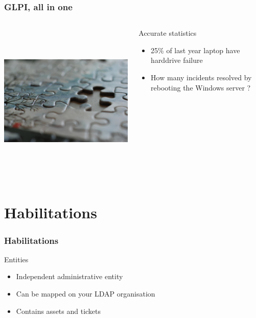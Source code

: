 \documentclass{beamer}
\begin{document}
\begin{frame}


    \frametitle{GLPI, all in one}
 \begin{columns}
 \begin{column}{0.45\textwidth}
         \includegraphics[height=7.5cm]{./pics/glpithelink.jpg}
 \end{column}
 \begin{column}{0.65\textwidth}
    \begin{block}{Accurate statistics}
        \begin{itemize}
            \item 25\% of last year laptop have harddrive failure
            \item How many incidents resolved by rebooting the Windows server ? 
        \end{itemize}

    \end{block}

 \end{column}
\end{columns}
\end{frame}

\section{Habilitations}

\begin{frame}
\frametitle{Habilitations}
    \begin{block}{Entities}
        \begin{itemize}
            \item Independent administrative entity
            \item Can be mapped on your LDAP organisation
            \item Contains assets and tickets
        \end{itemize}

    \end{block}
\end{frame}
\end{document}
